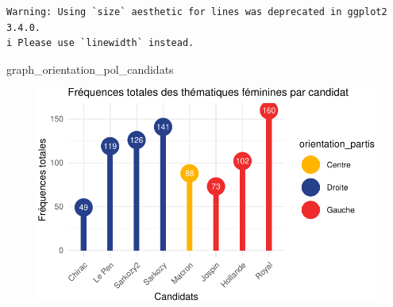 \documentclass[
  letterpaper,
  DIV=11,
  numbers=noendperiod]{scrartcl}
\newenvironment{Shaded}{\begin{snugshade}}{\end{snugshade}}
\newcommand{\NormalTok}[1]{\textcolor[rgb]{0.00,0.23,0.31}{#1}}
\begin{document}
\begin{verbatim}
Warning: Using `size` aesthetic for lines was deprecated in ggplot2 3.4.0.
i Please use `linewidth` instead.
\end{verbatim}

\begin{Shaded}
\begin{Highlighting}[]
\NormalTok{graph\_orientation\_pol\_candidats}
\end{Highlighting}
\end{Shaded}

\begin{figure}[H]

{\centering \includegraphics{Travail-Session_files/figure-pdf/unnamed-chunk-2-8.pdf}

}

\end{figure}
\end{document}
